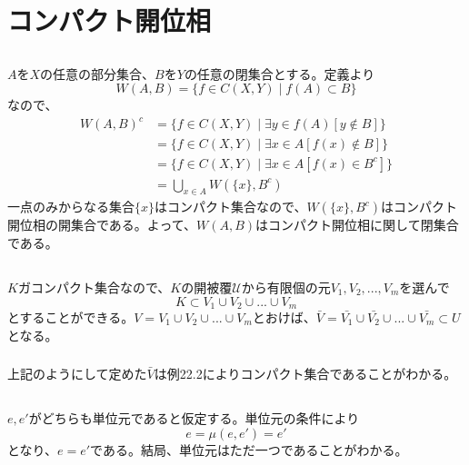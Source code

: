 \documentclass{jsarticle}
\begin{document}

\section{コンパクト開位相}
\subsection{}
$A$を$X$の任意の部分集合、$B$を$Y$の任意の閉集合とする。定義より
\[W(A,B)=\{f\in C(X,Y)\mid f(A)\subset B\}\]
なので、
\begin{align*}
W(A,B)^c&=\{f\in C(X,Y)\mid \exists y\in f(A)[ y\notin B ] \}\\
&=\{f\in C(X,Y)\mid \exists x\in A[f(x)\notin B]\}\\
&=\{f\in C(X,Y)\mid \exists x\in A[f(x)\in B^c]\}\\
&=\bigcup_{x\in A}W(\{x\},B^c)
\end{align*}
一点のみからなる集合$\{x\}$はコンパクト集合なので、$W(\{x\},B^c)$はコンパクト開位相の開集合である。よって、$W(A,B)$はコンパクト開位相に関して閉集合である。



\subsection{}
\subsubsection{}
$K$ガコンパクト集合なので、$K$の開被覆$\mathcal{U}$から有限個の元$V_1,V_2,...,V_m$を選んで
\[K\subset V_1\cup V_2\cup...\cup V_m\]
とすることができる。$V=V_1\cup V_2\cup...\cup V_m$とおけば、$\bar{V}=\bar{V_1}\cup \bar{V_2}\cup...\cup \bar{V_m}\subset U$となる。
\subsubsection{}
上記のようにして定めた$\bar{V}$は例22.2によりコンパクト集合であることがわかる。


\subsection{}
\subsubsection{}
$e,e'$がどちらも単位元であると仮定する。単位元の条件により
\[e=\mu(e,e')=e'\]
となり、$e=e'$である。結局、単位元はただ一つであることがわかる。
\end{document}
